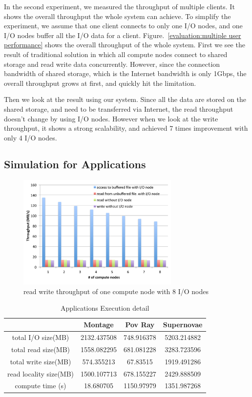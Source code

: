 In the second experiment, we measured the throughput of multiple clients.
It shows the overall throughput the whole system can achieve.
To simplify the experiment, we assume that one client connects to only one I/O nodes, and one I/O
nodes buffer all the I/O data for a client.
Figure.~\ref{evaluation:multiple user performance} shows the overall throughput of the whole system.
First we see the result of traditional solution in which all compute nodes connect to shared storage
and read write data concurrently.
However, since the connection bandwidth of shared storage, which is the Internet bandwidth is only
1Gbps, the overall throughput grows at first, and quickly hit the limitation.

Then we look at the result using our system.
Since all the data are stored on the shared storage, and need to
be transferred via Internet, the read throughput doesn't change by using I/O nodes.
However when we look at the write throughput, it shows a strong scalability, and achieved 7 times
improvement with only 4 I/O nodes.

\subsection{Simulation for Applications}

\begin{figure}
\centering
\includegraphics[width=8cm]{img/simulation_throughput}
\caption{read write throughput of one compute node with 8 I/O nodes}
\label{evaluation:simulation throughput}
\end{figure}

\begin{table}
\centering
\begin{tabular}{|c|c|c|c|}
\hline
						&	Montage		&		Pov Ray		&		Supernovae		\\\hline
total I/O size(MB)		&	2132.437508	&		748.916378	&		5203.214882		\\\hline
total read size(MB)		&	1558.082295	&		681.081228	&		3283.723596		\\\hline
total write size(MB)	&	574.355213	&		67.83515	&		1919.491286		\\\hline
read locality size(MB)	&	1500.107713	&		678.155227	&		2429.888509		\\\hline
compute time (s)		&	18.680705	&		1150.97979	&		1351.987268		\\
\hline
\end{tabular}
\caption{Applications Execution detail}
\label{evaluation:application execution detail}
\end{table}

